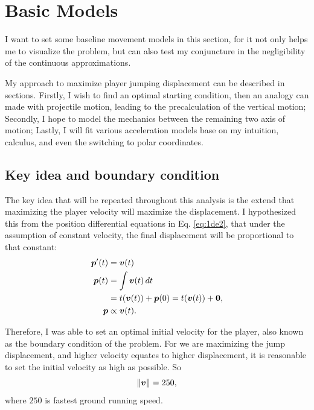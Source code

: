 
\section{Basic Models}
I want to set some baseline movement models in this section, for it not only helps me to visualize the problem, but can also test my conjuncture in the negligibility of the continuous approximations.

My approach to maximize player jumping displacement can be described in sections. Firstly, I wish to find an optimal starting condition, then an analogy can made with projectile motion, leading to the precalculation of the vertical motion; Secondly, I hope to model the mechanics between the remaining two axis of motion; Lastly, I will fit various acceleration models base on my intuition, calculus, and even the switching to polar coordinates.

\subsection{Key idea and boundary condition}
The key idea that will be repeated throughout this analysis is the extend that maximizing the player velocity will maximize the displacement. I hypothesized this from the position differential equations in Eq. \ref{eq:1de2}, that under the assumption of constant velocity, the final displacement will be proportional to that constant:
\begin{align*}
    \boldsymbol{p}'(t) &= \boldsymbol{v}(t)\\
    \boldsymbol{p}(t) &= \int \boldsymbol{v}(t) \, dt\\
    &= t(\boldsymbol{v}(t)) + \boldsymbol{p}(0) = t(\boldsymbol{v}(t)) + \boldsymbol{0},\\
    \boldsymbol{p} &\propto \boldsymbol{v}(t).
\end{align*}

Therefore, I was able to set an optimal initial velocity for the player, also known as the boundary condition of the problem. For we are maximizing the jump displacement, and higher velocity equates to higher displacement, it is reasonable to set the initial velocity as high as possible. So
\[
    \|\boldsymbol{v}\| = 250,
\]
where $250$ is fastest ground running speed.


